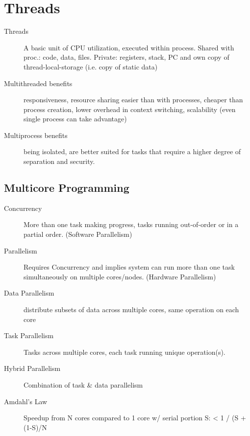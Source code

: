 \section*{Threads}
\begin{description}
  \item[Threads] A basic unit of CPU utilization, executed within process.  Shared with proc.: code, data, files. Private: registers, stack, PC and own copy of thread-local-storage (i.e. copy of static data)
  \item[Multithreaded benefits] responsiveness, resource sharing easier than with processes, cheaper than process creation, lower overhead in context switching, scalability (even single process can take advantage)
  \item[Multiprocess benefits] being isolated, are better suited for tasks that require a  higher degree of separation and security.  \end{description}

\subsection*{Multicore Programming}
\begin{description}
  \item[Concurrency] More than one task making progress, tasks running out-of-order or in a partial order. (Software Parallelism)
  \item[Parallelism] Requires Concurrency and implies system can run more than one task simultaneously on multiple cores/nodes. (Hardware Parallelism)
  \item[Data Parallelism] distribute subsets of data across multiple cores, same operation on each core
  \item[Task Parallelism]  Tasks across  multiple cores, each task running unique operation(s).
  \item[Hybrid Parallelism] Combination of task \& data parallelism
  \item[Amdahl's Law] Speedup from N cores compared to 1 core w/ serial portion S: < 1 / (S + (1-S)/N
\end{description}

